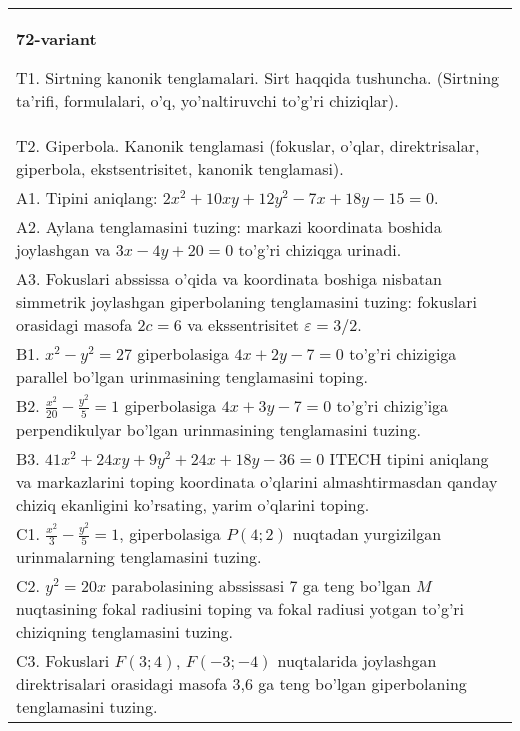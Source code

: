 \documentclass{article}
\begin{document}
\begin{tabular}{m{17cm}}
\textbf{72-variant}
\newline

T1. Sirtning kanonik tenglamalari. Sirt haqqida tushuncha. (Sirtning ta'rifi, formulalari, o'q, yo'naltiruvchi to'g'ri chiziqlar).\\

T2. Giperbola. Kanonik tenglamasi (fokuslar, o'qlar, direktrisalar, giperbola, ekstsentrisitet, kanonik tenglamasi).\\

A1. Tipini aniqlang: $2x^{2}+10xy+12y^{2}-7x+18y-15=0$.\\

A2. Aylana tenglamasini tuzing: markazi koordinata boshida joylashgan va $3x-4y+20=0$ to'g'ri chiziqga urinadi.\\

A3. Fokuslari abssissa o'qida va koordinata boshiga nisbatan simmetrik joylashgan giperbolaning tenglamasini tuzing: fokuslari orasidagi masofa $2c=6$ va ekssentrisitet $\varepsilon=3/2$.\\

B1. $x^{2} - y^{2} = 27$ giperbolasiga $4x + 2y - 7 = 0$ to'g'ri chizigiga parallel bo'lgan urinmasining tenglamasini toping.  \\

B2. $\frac{x^{2}}{20} - \frac{y^{2}}{5} = 1$ giperbolasiga $4x + 3y - 7 = 0$ to'g'ri chizig'iga perpendikulyar bo'lgan urinmasining tenglamasini tuzing.  \\

B3. $41x^{2} + 24xy + 9y^{2} + 24x + 18y - 36 = 0$ ITECH tipini aniqlang va markazlarini toping koordinata o'qlarini almashtirmasdan qanday chiziq ekanligini ko'rsating, yarim o'qlarini toping.  \\

C1. $\frac{x^{2}}{3} - \frac{y^{2}}{5} = 1$, giperbolasiga $P(4;2)$ nuqtadan yurgizilgan urinmalarning tenglamasini tuzing.  \\

C2. $y^{2} = 20x$ parabolasining abssissasi 7 ga teng bo'lgan $M$ nuqtasining fokal radiusini toping va fokal radiusi yotgan to'g'ri chiziqning tenglamasini tuzing.  \\

C3. Fokuslari $F(3;4)$, $F(-3;-4)$ nuqtalarida joylashgan direktrisalari orasidagi masofa 3,6 ga teng bo'lgan giperbolaning tenglamasini tuzing.  \\

\end{tabular}
\vspace{1cm}
\end{document}
